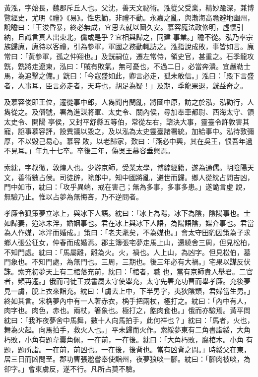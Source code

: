 \begin{pinyinscope}
 黃泓，字始長，魏郡斥丘人也。父沈，善天文祕術。泓從父受業，精妙踰深，兼博覽經史，尤明《禮》《易》。性忠勤，非禮不動。永嘉之亂，與渤海高瞻避地幽州，說瞻曰：「王浚昏暴，終必無成，宜思去就以圖久安。慕容廆法政修明，虛懷引納，且讖言真人出東北，儻或是乎？宜相與歸之，同建
 事業。」瞻不從。泓乃率宗族歸廆，廆待以客禮，引為參軍，軍國之務動輒訪之。泓指說成敗，事皆如言。廆常曰：「黃參軍，孤之仲翔也。」及皝嗣位，遷左常侍，領史官，甚重之。石季龍攻皝，皝將走遼東，泓曰：「賊有敗氣，無可憂也，不過二日，必當奔潰。宜嚴勒士馬，為追擊之備。」皝曰：「今寇盛如此，卿言必走，孤未敢信。」泓曰：「殿下言盛者，人事耳，臣言必走者，天時也，胡足為疑！」及期，季龍果退，皝益奇之。



 及慕容俊即王位，遷從事中郎，人雋聞冉閔亂，將圖中原，訪之於泓，泓勸行，人雋從之。及僭號，署為進謀將軍、太史令、關內侯，尋加奉車都尉、西海太守、領太史令、開陽
 亭侯，又封平舒縣五等伯，常從左右，諮決大事，靈臺令許敦害其寵，諂事慕容評，設異議以毀之，及以泓為太史靈臺諸署統，加給事中。泓待敦彌厚，不以毀己易心。慕容敗，以老歸家，歎曰：「燕必中興，其在吳王，恨吾年過不見耳。」年九十七卒。卒後三年，偽吳王慕容垂興焉。



 索紞，字叔徹，敦煌人也。少游京師，受業太學，博綜經籍，遂為通儒。明陰陽天文，善術數占侯。司徒辟，除郎中，知中國將亂，避世而歸。鄉人從紞占問吉凶，門中如市，紞曰：「攻乎異端，戒在害己；無為多事，多事多患。」遂詭言虛
 說，無驗乃止。惟以占夢為無悔吝，乃不逆問者。



 孝廉令狐策夢立冰上，與冰下人語。紞曰：「冰上為陽，冰下為陰，陰陽事也。士如歸妻，迨冰未泮，婚姻事也。君在冰上與冰下人語，為陽語陰，媒介事也。君當為人作媒，冰泮而婚成。」策曰：「老夫耄矣，不為媒也。」會太守田豹因策為子求鄉人張公征女，仲春而成婚焉。郡主簿張宅夢走馬上山，還繞舍三周，但見松柏，不知門處。紞曰：「馬屬離，離為火。火，禍也。人上山，為凶字。但見松伯，墓門象也。不知門處，為無門也。三周，三期也。後三年必有大禍。」宅果以謀反伏誅。索充初夢天上有二棺落充前，紞曰：「棺者，職
 也，當有京師貴人舉君。二官者，頻再遷。」俄而司徒王戎書屬太守使舉充，太守先署充功曹而舉孝廉。充後夢見一虜，脫上衣來詣充。紞曰：「虜去上中，下半男字，夷狄陰類，君婦當生男。」終如其言。宋桷夢內中有一人著赤衣，桷手把兩杖，極打之。紞曰：「內中有人，肉字也。肉色，赤也。兩杖，箸象也。極打之，飽肉食也。」俄而亦驗焉。黃平問紞曰：「我昨夜夢舍中馬舞，數十人向馬拍手，此何祥也？」紞曰：「馬者，火也，舞為火起。向馬拍手，救火人也。」平未歸而火作。索綏夢東有二角書詣綏，大角朽敗，小角有題韋囊角佩，一在前，一在後。紞曰：「大角朽敗，腐棺木。小角
 有題，題所詣。一在前，前凶也。一在後，後背也。當有凶背之問。」時綏父在東，居三日而凶問至。郡功曹張邈嘗奉使詣州，夜夢狼啖一腳。紞曰：「腳肉被啖，為卻字。」會東虜反，遂不行。凡所占莫不驗。




\end{pinyinscope}
